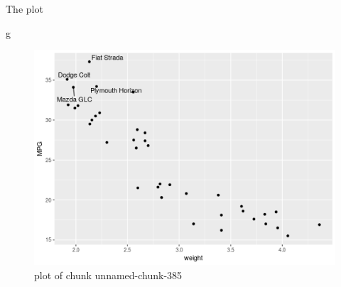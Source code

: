 \documentclass[ignorenonframetext,]{beamer}
\newenvironment{Shaded}{\begin{snugshade}}{\end{snugshade}}
\newcommand{\NormalTok}[1]{#1}
\begin{document}
\begin{frame}[fragile]{The plot}
\protect\hypertarget{the-plot-5}{}

\begin{Shaded}
\begin{Highlighting}[]
\NormalTok{g}
\end{Highlighting}
\end{Shaded}

\begin{figure}
\centering
\includegraphics{figure/unnamed-chunk-385-1.png}
\caption{plot of chunk unnamed-chunk-385}
\end{figure}

\end{frame}
\end{document}
